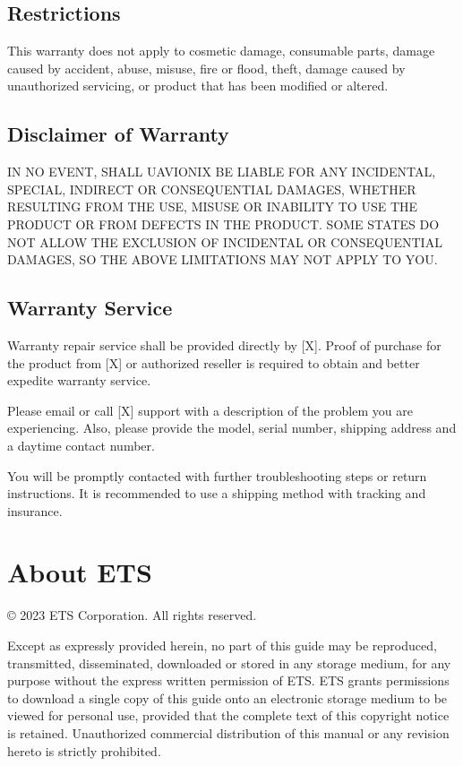 \documentclass[letterpaper,10pt,english]{sphinxmanual}
\begin{document}
\subsection{Restrictions}
\label{\detokenize{limited-warranty:restrictions}}
\sphinxAtStartPar
This warranty does not apply to cosmetic damage,
consumable parts, damage caused by accident, abuse, misuse, fire or
flood, theft, damage caused by unauthorized servicing, or product that has
been modified or altered.


\subsection{Disclaimer of Warranty}
\label{\detokenize{limited-warranty:disclaimer-of-warranty}}
\sphinxAtStartPar
IN NO EVENT, SHALL UAVIONIX BE LIABLE
FOR ANY INCIDENTAL, SPECIAL, INDIRECT OR CONSEQUENTIAL
DAMAGES, WHETHER RESULTING FROM THE USE, MISUSE OR
INABILITY TO USE THE PRODUCT OR FROM DEFECTS IN THE
PRODUCT. SOME STATES DO NOT ALLOW THE EXCLUSION OF
INCIDENTAL OR CONSEQUENTIAL DAMAGES, SO THE ABOVE
LIMITATIONS MAY NOT APPLY TO YOU.


\subsection{Warranty Service}
\label{\detokenize{limited-warranty:warranty-service}}
\sphinxAtStartPar
Warranty repair service shall be provided directly by
{[}X{]}. Proof of purchase for the product from {[}X{]} or authorized
reseller is required to obtain and better expedite warranty service.

\sphinxAtStartPar
Please email or call {[}X{]} support with a description of the problem you
are experiencing. Also, please provide the model, serial number, shipping
address and a daytime contact number.

\sphinxAtStartPar
You will be promptly contacted with further troubleshooting steps or return
instructions. It is recommended to use a shipping method with tracking and
insurance.

\sphinxstepscope


\section{About ETS}
\label{\detokenize{about/ets:about-ets}}\label{\detokenize{about/ets::doc}}
\sphinxAtStartPar
© 2023 ETS Corporation. All rights reserved.

\sphinxAtStartPar
Except as expressly provided herein, no part of this guide may be
reproduced, transmitted, disseminated, downloaded or stored in any
storage medium, for any purpose without the express written permission of
ETS. ETS grants permissions to download a single copy of this
guide onto an electronic storage medium to be viewed for personal use,
provided that the complete text of this copyright notice is retained.
Unauthorized commercial distribution of this manual or any revision hereto
is strictly prohibited.
\end{document}
